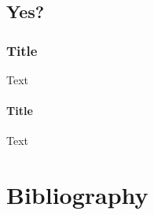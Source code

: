 \documentclass{uob-thesis}
\begin{document}
\lipsum[1-2]
\parencite{qian2021}
\lipsum[2-13]
\textcite{qian2021}

\section{Yes?}

\lipsum[13-16]
\subsection{Title}
Text
\subsubsection{Title}
Text


\backmatter

\chapter{Bibliography}

\printbibliography[heading=none]
\end{document}
